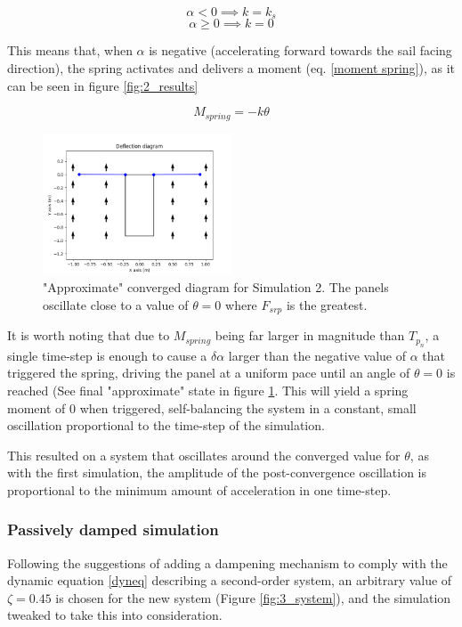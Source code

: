 $$ \alpha < 0 \implies k = k_{s}$$
$$ \alpha \geq 0 \implies k = 0$$

This means that, when $\alpha$ is negative (accelerating forward towards the sail facing direction), the spring activates and delivers a moment (eq. \ref{moment spring}), as it can be seen in figure \ref{fig:2_results}

\begin{equation}
    M_{spring} = -k\theta \label{moment spring}
\end{equation}

\begin{figure}[!htb]
\centering
\includegraphics[width=0.5\textwidth]{images/second/deflection_diagram.png}
\caption{"Approximate" converged diagram for Simulation 2. The panels oscillate close to a value of $\theta = 0$ where $F_{srp}$ is the greatest.}
\label{fig:2_diagram}
\end{figure}

It is worth noting that due to $M_{spring}$ being far larger in magnitude than $T_{p_n}$, a single time-step is enough to cause a $\delta\alpha$ larger than the negative value of $\alpha$ that triggered the spring, driving the panel at a uniform pace until an angle of $\theta = 0$ is reached (See final "approximate" state in figure \ref{fig:2_diagram}. This will yield a spring moment of 0 when triggered, self-balancing the system in a constant, small oscillation proportional to the time-step of the simulation.

This resulted on a system that oscillates around the converged value for $\theta$, as with the first simulation, the amplitude of the post-convergence oscillation is proportional to the minimum amount of acceleration in one time-step.

\subsubsection{Passively damped simulation}

Following the suggestions of adding a dampening mechanism to comply with the dynamic equation \ref{dyneq} describing a second-order system, an arbitrary value of $\zeta = 0.45$ is chosen for the new system (Figure \ref{fig:3_system}), and the simulation tweaked to take this into consideration.

